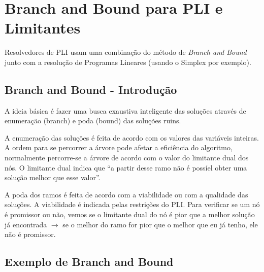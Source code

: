 \chapter{Branch and Bound para PLI e Limitantes}

Resolvedores de PLI usam uma combinação do método de \textit{Branch and Bound} junto com a resolução de Programas Lineares (usando o Simplex por exemplo).

\section{Branch and Bound - Introdução}

A ideia básica é fazer uma busca exaustiva inteligente das soluções através de enumeração (branch) e poda (bound) das soluções ruins.

A enumeração das soluções é feita de acordo com os valores das variáveis inteiras. A ordem para se percorrer a árvore pode afetar a eficiência do algoritmo, normalmente percorre-se a árvore de acordo com o valor do limitante dual dos nós. O limitante dual indica que ``a partir desse ramo não é possíel obter uma solução melhor que esse valor''.

A poda dos ramos é feita de acordo com a viabilidade ou com a qualidade das soluções. A viabilidade é indicada pelas restrições do PLI. Para verificar se um nó é promissor ou não, vemos se o limitante dual do nó é pior que a melhor solução já encontrada $\to$ se o melhor do ramo for pior que o melhor que eu já tenho, ele não é promissor.

\section{Exemplo de Branch and Bound}

